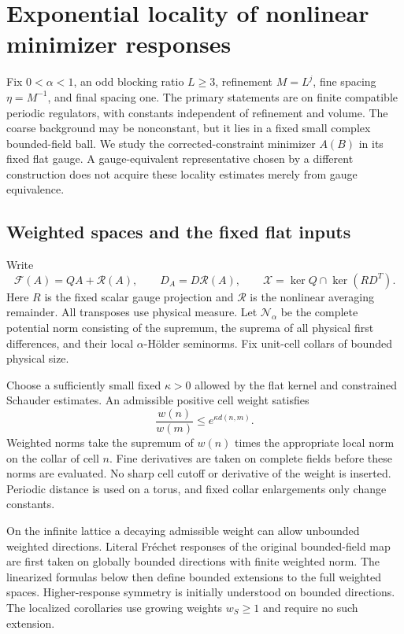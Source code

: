 \documentclass[11pt]{article}
\theoremstyle{remark}\newtheorem{remark}[theorem]{Remark}
\newcommand{\norm}[1]{\left\lVert#1\right\rVert}
\begin{document}

\section{Exponential locality of nonlinear minimizer responses}
\label{wr-section}

Fix $0<\alpha<1$, an odd blocking ratio $L\ge3$, refinement
$M=L^j$, fine spacing $\eta=M^{-1}$, and final spacing one.
The primary statements are on finite compatible periodic
regulators, with constants independent of refinement and volume.
The coarse background may be nonconstant, but it lies in a fixed
small complex bounded-field ball. We study the corrected-constraint
minimizer $A(B)$ in its fixed flat gauge. A gauge-equivalent
representative chosen by a different construction does not acquire
these locality estimates merely from gauge equivalence.

\subsection{Weighted spaces and the fixed flat inputs}
\label{wr-spaces}

Write
\[
 \mathcal F(A)=QA+\mathcal R(A),\qquad
 D_A=D\mathcal R(A),\qquad
 \mathcal X=\ker Q\cap\ker(RD^T).
\]
Here $R$ is the fixed scalar gauge projection and
$\mathcal R$ is the nonlinear averaging remainder. All transposes
use physical measure. Let $\mathcal N_\alpha$ be the complete
potential norm consisting of the supremum, the suprema of all
physical first differences, and their local $\alpha$-H\"older
seminorms. Fix unit-cell collars of bounded physical size.

Choose a sufficiently small fixed $\kappa>0$ allowed by the flat
kernel and constrained Schauder estimates. An admissible positive
cell weight satisfies
\begin{equation}\label{wr-weight}
 \frac{w(n)}{w(m)}\le e^{\kappa d(n,m)}.
\end{equation}
Weighted norms take the supremum of $w(n)$ times the appropriate
local norm on the collar of cell $n$. Fine derivatives are taken
on complete fields before these norms are evaluated. No sharp cell
cutoff or derivative of the weight is inserted. Periodic distance
is used on a torus, and fixed collar enlargements only change
constants.

On the infinite lattice a decaying admissible weight can allow
unbounded weighted directions. Literal Fr\'echet responses of the
original bounded-field map are first taken on globally bounded
directions with finite weighted norm. The linearized formulas
below then define bounded extensions to the full weighted spaces.
Higher-response symmetry is initially understood on bounded
directions. The localized corollaries use growing weights
$w_S\ge1$ and require no such extension.
\end{document}
